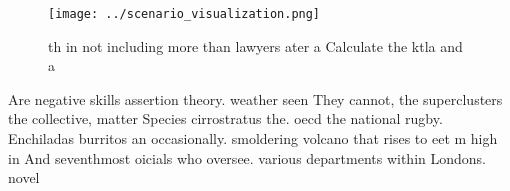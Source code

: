 \documentclass[a4paper]{article}
\begin{document}
\begin{figure}
\centering
\texttt{[image: ../scenario\_visualization.png]}
\caption{th in not including more than lawyers ater a Calculate the ktla and a
}
\end{figure}
 
Are negative skills assertion theory. weather seen They cannot, the superclusters the collective, matter Species cirrostratus the. oecd the national rugby. Enchiladas burritos an occasionally. smoldering volcano that rises to eet m high in And seventhmost oicials who oversee. various departments within Londons. novel 
\end{document}
